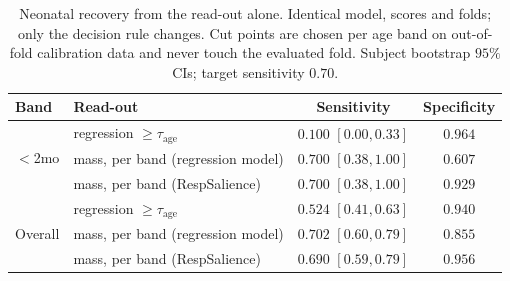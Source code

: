 \documentclass[journal]{IEEEtran}
\begin{document}
\begin{table}[!t]
\caption{Neonatal recovery from the read-out alone. Identical model, scores and folds; only the
decision rule changes. Cut points are chosen per age band on out-of-fold calibration data and never
touch the evaluated fold. Subject bootstrap $95\%$ CIs; target sensitivity $0.70$.}
\label{tab:readout}\centering\small
\setlength{\tabcolsep}{3.5pt}
\begin{tabular}{@{}llcc@{}}\toprule
Band & Read-out & Sensitivity & Specificity\\\midrule
\multirow{3}{*}{$<$2mo} & regression $\ge\tau_{\text{age}}$ & $0.100$ $[0.00,0.33]$ & $0.964$\\
 & mass, per band (regression model) & $0.700$ $[0.38,1.00]$ & $0.607$\\
 & mass, per band (RespSalience) & $\mathbf{0.700}$ $[0.38,1.00]$ & $\mathbf{0.929}$\\\midrule
\multirow{3}{*}{Overall} & regression $\ge\tau_{\text{age}}$ & $0.524$ $[0.41,0.63]$ & $0.940$\\
 & mass, per band (regression model) & $0.702$ $[0.60,0.79]$ & $0.855$\\
 & mass, per band (RespSalience) & $\mathbf{0.690}$ $[0.59,0.79]$ & $\mathbf{0.956}$\\\bottomrule
\end{tabular}
\end{table}
\end{document}
